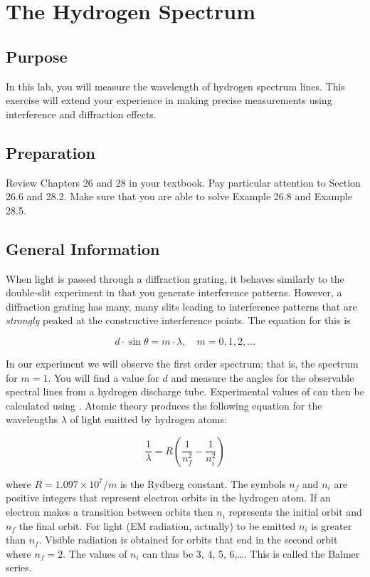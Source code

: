 \chapter{The Hydrogen Spectrum}

\section{Purpose}
	In this lab, you will measure the wavelength of hydrogen spectrum lines.  This exercise will extend your experience in making precise measurements using interference and diffraction effects.

\section{Preparation}
  Review Chapters 26 and 28 in your textbook.  Pay particular attention to Section 26.6 and 28.2.  Make sure that you are able to solve Example 26.8 and Example 28.5.
  
\section{General Information}
When light is passed through a diffraction grating, it behaves similarly to the double-slit experiment in that you generate interference patterns.  However, a diffraction grating has many, many slits leading to interference patterns that are \textit{strongly} peaked at the constructive interference points.  The equation for this is

\begin{equation} \label{e:nfere} 
	d\cdot \sin\theta = m\cdot \lambda, \quad m = 0, 1, 2, \dots
\end {equation}

In our experiment we will observe the first order spectrum; that is, the spectrum for $m = 1$.  You will find a value for $d$ and measure the angles  for the observable spectral lines from a hydrogen discharge tube.  Experimental values of  can then be calculated using .
Atomic theory produces the following equation for the wavelengths $\lambda$ of light emitted by hydrogen atoms:

\begin{equation}\label{e:balmer}
	\frac{1}{\lambda}= R\left(\frac{1}{n_f^2}-\frac{1}{n_i^2}\right)
\end{equation}

where $R = 1.097 \times 10^7/m$ is the Rydberg constant.  The symbols $n_f$ and $n_i$ are positive integers that represent electron orbits in the hydrogen atom.  If an electron makes a transition between orbits then $n_i$ represents the initial orbit and $n_f$ the final orbit.  For light (EM radiation, actually) to be emitted $n_i$ is greater than $n_f$.  Visible radiation is obtained for orbits that end in the second orbit where $n_f = 2$.  The values of $n_i$ can thus be 3, 4, 5, 6,\dots .  This is called the Balmer series.

